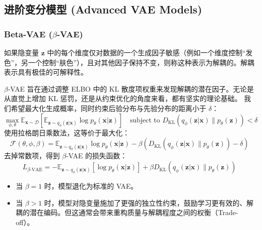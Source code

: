 \documentclass[zihao=-4, fontset=windows]{ctexart}
\begin{document}
\subsection{进阶变分模型 (Advanced VAE Models)}

\subsubsection{Beta-VAE ($\beta$-VAE)}
\begin{definition}
	如果隐变量 $\mathbf{z}$ 中的每个维度仅对数据的一个生成因子敏感（例如一个维度控制“发色”，另一个控制“肤色”），且对其他因子保持不变，则称这种表示为解耦的。解耦表示具有极佳的可解释性。
\end{definition}

$\beta$-VAE 旨在通过调整 ELBO 中的 KL 散度项权重来发现解耦的潜在因子。无论是从直觉上增加 KL 惩罚，还是从约束优化的角度来看，都有坚实的理论基础。
我们希望最大化生成概率，同时约束后验分布与先验分布的距离小于 $\delta$：
\begin{equation}
	\max_{\phi, \theta} \mathbb{E}_{\mathbf{x}\sim\mathcal{D}}[\mathbb{E}_{\mathbf{z} \sim q_\phi(\mathbf{z}|\mathbf{x})} \log p_\theta(\mathbf{x}|\mathbf{z})] \quad \text{subject to } D_{\text{KL}}(q_\phi(\mathbf{z}|\mathbf{x})\|p_\theta(\mathbf{z})) < \delta
\end{equation}
使用拉格朗日乘数法，这等价于最大化：
\begin{equation}
	\mathcal{F}(\theta, \phi, \beta) = \mathbb{E}_{\mathbf{z} \sim q_\phi(\mathbf{z}|\mathbf{x})} \log p_\theta(\mathbf{x}|\mathbf{z}) - \beta (D_{\text{KL}}(q_\phi(\mathbf{z}|\mathbf{x})\|p_\theta(\mathbf{z})) - \delta)
\end{equation}
去掉常数项，得到 $\beta$-VAE 的损失函数：
\begin{equation}
	L_{\beta\text{-VAE}} = - \mathbb{E}_{\mathbf{z} \sim q_\phi(\mathbf{z}|\mathbf{x})} [\log p_\theta(\mathbf{x}|\mathbf{z})] + \beta D_{\text{KL}}(q_\phi(\mathbf{z}|\mathbf{x}) \| p_\theta(\mathbf{z}))
\end{equation}
\begin{note}
	\begin{itemize}
		\item 当 $\beta=1$ 时，模型退化为标准的 VAE。
		\item 当 $\beta > 1$ 时，模型对隐变量施加了更强的独立性约束，鼓励学习更有效的、解耦的潜在编码。但这通常会带来重构质量与解耦程度之间的权衡（Trade-off）。
	\end{itemize}
\end{note}
\end{document}
